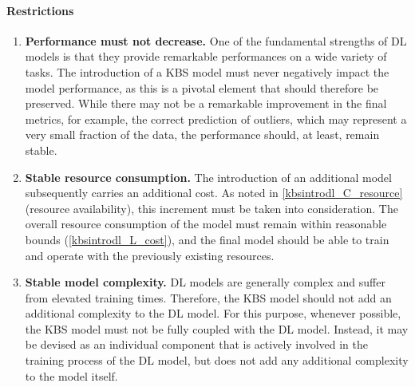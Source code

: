 \paragraph{Restrictions}
\begin{enumerate} [start=1,label={\bfseries R\arabic*.}]
    \item \label{kbsintrodl_R_performance} \textbf{Performance must not decrease.} One of the fundamental strengths of DL models is that they provide remarkable performances on a wide variety of tasks. The introduction of a KBS model must never negatively impact the model performance, as this is a pivotal element that should therefore be preserved. While there may not be a remarkable improvement in the final metrics, for example, the correct prediction of outliers, which may represent a very small fraction of the data, the performance should, at least, remain stable.
    
    \item \label{kbsintrodl_R_resource} \textbf{Stable resource consumption.} The introduction of an additional model subsequently carries an additional cost. As noted in \ref{kbsintrodl_C_resource} (resource availability), this increment must be taken into consideration. The overall resource consumption of the model must remain within reasonable bounds (\ref{kbsintrodl_L_cost}), and the final model should be able to train and operate with the previously existing resources.
    
    \item \label{kbsintrodl_R_complexity} \textbf{Stable model complexity.} DL models are generally complex and suffer from elevated training times. Therefore, the KBS model should not add an additional complexity to the DL model. For this purpose, whenever possible, the KBS model must not be fully coupled with the DL model. Instead, it may be devised as an individual component that is actively involved in the training process of the DL model, but does not add any additional complexity to the model itself. 
    
\end{enumerate}
